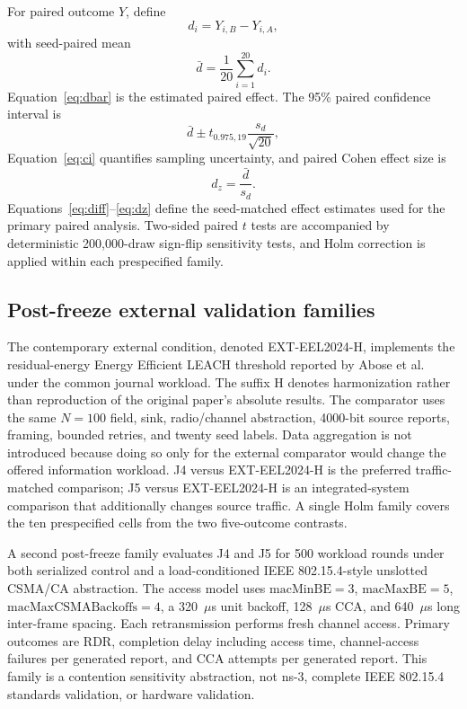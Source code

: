 \documentclass[pdflatex,sn-mathphys-num]{sn-jnl}
\begin{document}
For paired outcome $Y$, define
\begin{equation}
d_i=Y_{i,B}-Y_{i,A},
\label{eq:diff}
\end{equation}
with seed-paired mean
\begin{equation}
\bar d=\frac{1}{20}\sum_{i=1}^{20}d_i.
\label{eq:dbar}
\end{equation}
Equation~\eqref{eq:dbar} is the estimated paired effect. The 95\% paired confidence interval is
\begin{equation}
\bar d\pm t_{0.975,19}\frac{s_d}{\sqrt{20}},
\label{eq:ci}
\end{equation}
Equation~\eqref{eq:ci} quantifies sampling uncertainty, and paired Cohen effect size is
\begin{equation}
d_z=\frac{\bar d}{s_d}.
\label{eq:dz}
\end{equation}
Equations~\eqref{eq:diff}--\eqref{eq:dz} define the seed-matched effect estimates used for the primary paired analysis. Two-sided paired $t$ tests are accompanied by deterministic 200,000-draw sign-flip sensitivity tests, and Holm correction is applied within each prespecified family.

\subsection{Post-freeze external validation families}

The contemporary external condition, denoted EXT-EEL2024-H, implements the residual-energy Energy Efficient LEACH threshold reported by Abose et al.~\cite{abose2024} under the common journal workload. The suffix H denotes harmonization rather than reproduction of the original paper's absolute results. The comparator uses the same $N=100$ field, sink, radio/channel abstraction, 4000-bit source reports, framing, bounded retries, and twenty seed labels. Data aggregation is not introduced because doing so only for the external comparator would change the offered information workload. J4 versus EXT-EEL2024-H is the preferred traffic-matched comparison; J5 versus EXT-EEL2024-H is an integrated-system comparison that additionally changes source traffic. A single Holm family covers the ten prespecified cells from the two five-outcome contrasts.

A second post-freeze family evaluates J4 and J5 for 500 workload rounds under both serialized control and a load-conditioned IEEE 802.15.4-style unslotted CSMA/CA abstraction. The access model uses $\mathrm{macMinBE}=3$, $\mathrm{macMaxBE}=5$, $\mathrm{macMaxCSMABackoffs}=4$, a 320~$\mu$s unit backoff, 128~$\mu$s CCA, and 640~$\mu$s long inter-frame spacing. Each retransmission performs fresh channel access. Primary outcomes are RDR, completion delay including access time, channel-access failures per generated report, and CCA attempts per generated report. This family is a contention sensitivity abstraction, not ns-3, complete IEEE 802.15.4 standards validation, or hardware validation.
\end{document}
